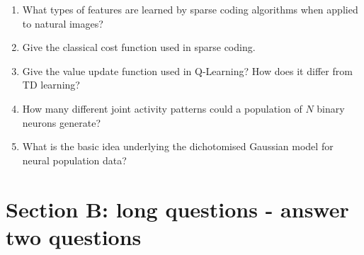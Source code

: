 \documentclass{article}
\newif\ifanswer
\begin{document}
\begin{enumerate}
  \ifanswer \textbf{Answer}: The existence of a teacher (or teaching signal) in supervised learning, and a reward signal in reinforcement learning.\\
  \fi
  
  
\item What types of features are learned by sparse coding algorithms when applied to natural images?

  \ifanswer \textbf{Answer}: Features representing statistics of natural images, such as oriented bars/edges.\\
  \fi
  
\item Give the classical cost function used in sparse coding.

  \ifanswer \textbf{Answer}: $\mathrm{cost} = \Vert U - WV \Vert_2^2 + \lambda \Vert V\Vert_1$, where $V$ is the activity of output neurons and $U$ is the input activity of input neurons. The second term enforces sparsity.\\
  \fi
  
\item Give the value update function used in Q-Learning? How does it differ from TD learning?

  \ifanswer \textbf{Answer}: $\underbrace{Q(S_t, A_t)}_{\mathrm{value}} = Q(S_t, A_t) + (\overbrace{\underbrace{R_{t+1}}_{\mathrm{reward}}+\lambda \underbrace{\mathrm{max}_a Q(S_{t+1},a)}_{\mathrm{future\:value}}}^{\mathrm{learned\:value}}-Q_{t}(S_t,A_t))$. It differs from TD learning in that it takes the action with maximal value for the update, which makes Q-learning an off-policy method.\\
  \fi

\item How many different joint activity patterns could a population of $N$ binary neurons generate?

\ifanswer \textbf{answer to appear} \fi
  
\item What is the basic idea underlying the dichotomised Gaussian model for neural population data?

  \ifanswer \textbf{answer to appear}
  \fi

\end{enumerate}
  
\section*{Section B: long questions - answer two questions}
\end{document}
